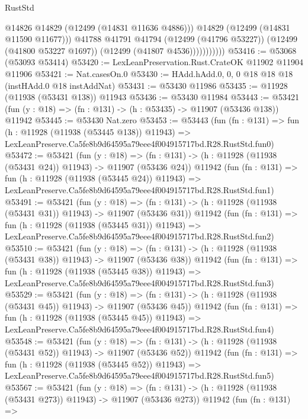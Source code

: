\begin{lexlean}{RustStd}
\begin{coremodule}
                          @14826
                          @14829
                          (@12499 (@14831 @11636 @4886)))
                        @14829
                        (@12499 (@14831 @11590 @11677)))
                      @41788
                      @41791
                      @41794
                      (@12499 (@41796 @53227))
                      (@12499 (@41800 @53227 @1697))
                      (@12499 (@41807 @4536)))))))))))
@53416 := @53068 (@53093 @53414)
@53420 := LexLeanPreservation.Rust.CrateOK @11902 @11904 @11906
@53421 := Nat.casesOn.{0}
@53430 := HAdd.hAdd.{0, 0, 0} @18 @18 @18 (instHAdd.{0} @18 instAddNat)
@53431 := @53430 @11986
@53435 := @11928 (@11938 (@53431 @138)) @11943
@53436 := @53430 @11984
@53443 := @53421 (fun (y : @18) => (fn : @131) -> (h : @53435) -> @11907 (@53436 @138)) @11942
@53445 := @53430 Nat.zero
@53453 := @53443
    (fun (fn : @131) =>
    fun (h : @11928 (@11938 (@53445 @138)) @11943) =>
    LexLeanPreserve.Ca5fe8b9d64595a79eee4f004915717bd.R28.RustStd.fun0)
@53472 := @53421
    (fun (y : @18) =>
    (fn : @131) -> (h : @11928 (@11938 (@53431 @24)) @11943) -> @11907 (@53436 @24))
    @11942
    (fun (fn : @131) =>
    fun (h : @11928 (@11938 (@53445 @24)) @11943) =>
    LexLeanPreserve.Ca5fe8b9d64595a79eee4f004915717bd.R28.RustStd.fun1)
@53491 := @53421
    (fun (y : @18) =>
    (fn : @131) -> (h : @11928 (@11938 (@53431 @31)) @11943) -> @11907 (@53436 @31))
    @11942
    (fun (fn : @131) =>
    fun (h : @11928 (@11938 (@53445 @31)) @11943) =>
    LexLeanPreserve.Ca5fe8b9d64595a79eee4f004915717bd.R28.RustStd.fun2)
@53510 := @53421
    (fun (y : @18) =>
    (fn : @131) -> (h : @11928 (@11938 (@53431 @38)) @11943) -> @11907 (@53436 @38))
    @11942
    (fun (fn : @131) =>
    fun (h : @11928 (@11938 (@53445 @38)) @11943) =>
    LexLeanPreserve.Ca5fe8b9d64595a79eee4f004915717bd.R28.RustStd.fun3)
@53529 := @53421
    (fun (y : @18) =>
    (fn : @131) -> (h : @11928 (@11938 (@53431 @45)) @11943) -> @11907 (@53436 @45))
    @11942
    (fun (fn : @131) =>
    fun (h : @11928 (@11938 (@53445 @45)) @11943) =>
    LexLeanPreserve.Ca5fe8b9d64595a79eee4f004915717bd.R28.RustStd.fun4)
@53548 := @53421
    (fun (y : @18) =>
    (fn : @131) -> (h : @11928 (@11938 (@53431 @52)) @11943) -> @11907 (@53436 @52))
    @11942
    (fun (fn : @131) =>
    fun (h : @11928 (@11938 (@53445 @52)) @11943) =>
    LexLeanPreserve.Ca5fe8b9d64595a79eee4f004915717bd.R28.RustStd.fun5)
@53567 := @53421
    (fun (y : @18) =>
    (fn : @131) -> (h : @11928 (@11938 (@53431 @273)) @11943) -> @11907 (@53436 @273))
    @11942
    (fun (fn : @131) =>

\end{coremodule}
\end{lexlean}
